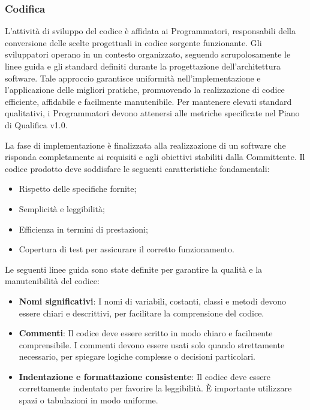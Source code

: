 \begin{table}[h!]
\subsubsection{Codifica}
L'attività di sviluppo del codice è affidata ai Programmatori, responsabili della conversione delle scelte progettuali in codice sorgente funzionante. Gli sviluppatori operano in un contesto organizzato, seguendo scrupolosamente le linee guida e gli standard definiti durante la progettazione dell'architettura software. Tale approccio garantisce uniformità nell'implementazione e l'applicazione delle migliori pratiche, promuovendo la realizzazione di codice efficiente, affidabile e facilmente manutenibile. 
Per mantenere elevati standard qualitativi, i Programmatori devono attenersi alle metriche specificate nel Piano di Qualifica v1.0.

La fase di implementazione è finalizzata alla realizzazione di un software che risponda completamente ai requisiti e agli obiettivi stabiliti dalla Committente. Il codice prodotto deve soddisfare le seguenti caratteristiche fondamentali:
\begin{itemize}[noitemsep, topsep=5pt]
    \item Rispetto delle specifiche fornite;
    \item Semplicità e leggibilità;
    \item Efficienza in termini di prestazioni;
    \item Copertura di test per assicurare il corretto funzionamento.
\end{itemize}

Le seguenti linee guida sono state definite per garantire la qualità e la manutenibilità del codice:

\begin{itemize}
  \item \textbf{Nomi significativi}: I nomi di variabili, costanti, classi e metodi devono essere chiari e descrittivi, per facilitare la comprensione del codice.
  
  \item \textbf{Commenti}: Il codice deve essere scritto in modo chiaro e facilmente comprensibile. I commenti devono essere usati solo quando strettamente necessario, per spiegare logiche complesse o decisioni particolari.
  
  \item \textbf{Indentazione e formattazione consistente}: Il codice deve essere correttamente indentato per favorire la leggibilità. È importante utilizzare spazi o tabulazioni in modo uniforme.


\end{itemize}
\end{table}
